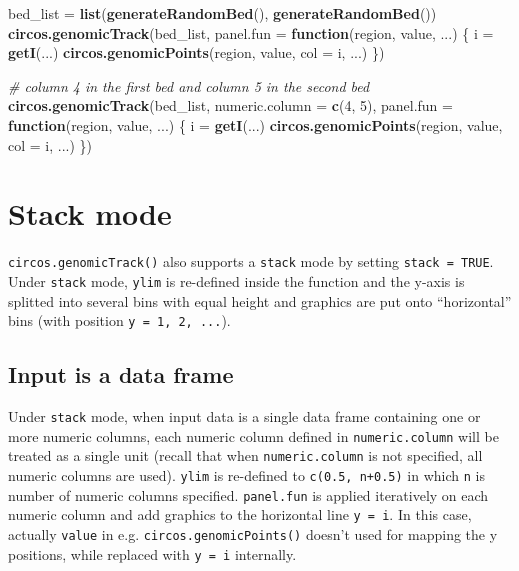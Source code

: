 \documentclass[]{book}
\newenvironment{Shaded}{\begin{snugshade}}{\end{snugshade}}
\newcommand{\KeywordTok}[1]{\textcolor[rgb]{0.13,0.29,0.53}{\textbf{#1}}}
\newcommand{\DataTypeTok}[1]{\textcolor[rgb]{0.13,0.29,0.53}{#1}}
\newcommand{\DecValTok}[1]{\textcolor[rgb]{0.00,0.00,0.81}{#1}}
\newcommand{\StringTok}[1]{\textcolor[rgb]{0.31,0.60,0.02}{#1}}
\newcommand{\CommentTok}[1]{\textcolor[rgb]{0.56,0.35,0.01}{\textit{#1}}}
\newcommand{\ControlFlowTok}[1]{\textcolor[rgb]{0.13,0.29,0.53}{\textbf{#1}}}
\newcommand{\NormalTok}[1]{#1}
\theoremstyle{definition}
\theoremstyle{definition}
\theoremstyle{remark}
\begin{document}
\begin{Shaded}
\begin{Highlighting}[]
\NormalTok{bed_list =}\StringTok{ }\KeywordTok{list}\NormalTok{(}\KeywordTok{generateRandomBed}\NormalTok{(), }\KeywordTok{generateRandomBed}\NormalTok{())}
\KeywordTok{circos.genomicTrack}\NormalTok{(bed_list,}
    \DataTypeTok{panel.fun =} \ControlFlowTok{function}\NormalTok{(region, value, ...) \{}
\NormalTok{        i =}\StringTok{ }\KeywordTok{getI}\NormalTok{(...)}
        \KeywordTok{circos.genomicPoints}\NormalTok{(region, value, }\DataTypeTok{col =}\NormalTok{ i, ...)}
\NormalTok{\})}

\CommentTok{# column 4 in the first bed and column 5 in the second bed}
\KeywordTok{circos.genomicTrack}\NormalTok{(bed_list, }\DataTypeTok{numeric.column =} \KeywordTok{c}\NormalTok{(}\DecValTok{4}\NormalTok{, }\DecValTok{5}\NormalTok{),}
    \DataTypeTok{panel.fun =} \ControlFlowTok{function}\NormalTok{(region, value, ...) \{}
\NormalTok{        i =}\StringTok{ }\KeywordTok{getI}\NormalTok{(...)}
        \KeywordTok{circos.genomicPoints}\NormalTok{(region, value, }\DataTypeTok{col =}\NormalTok{ i, ...)}
\NormalTok{\})}
\end{Highlighting}
\end{Shaded}

\section{Stack mode}\label{stack-mode}

\texttt{circos.genomicTrack()} also supports a \texttt{stack} mode by
setting \texttt{stack\ =\ TRUE}. Under \texttt{stack} mode,
\texttt{ylim} is re-defined inside the function and the y-axis is
splitted into several bins with equal height and graphics are put onto
``horizontal'' bins (with position \texttt{y\ =\ 1,\ 2,\ ...}).

\subsection{Input is a data frame}\label{input-is-a-data-frame-1}

Under \texttt{stack} mode, when input data is a single data frame
containing one or more numeric columns, each numeric column defined in
\texttt{numeric.column} will be treated as a single unit (recall that
when \texttt{numeric.column} is not specified, all numeric columns are
used). \texttt{ylim} is re-defined to \texttt{c(0.5,\ n+0.5)} in which
\texttt{n} is number of numeric columns specified. \texttt{panel.fun} is
applied iteratively on each numeric column and add graphics to the
horizontal line \texttt{y\ =\ i}. In this case, actually \texttt{value}
in e.g. \texttt{circos.genomicPoints()} doesn't used for mapping the y
positions, while replaced with \texttt{y\ =\ i} internally.
\end{document}
